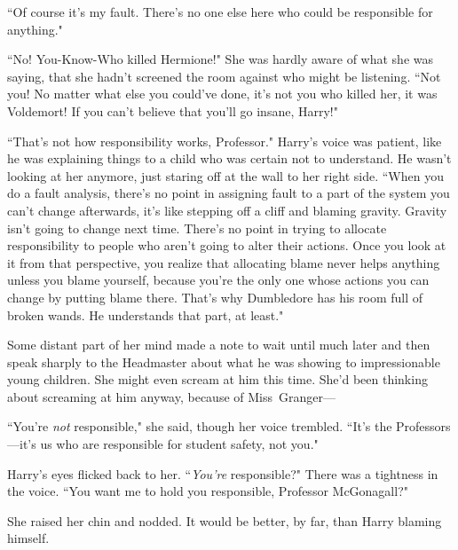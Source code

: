 ``Of course it's my fault. There's no one else here who could be responsible for anything."

``No! You-Know-Who killed Hermione!" She was hardly aware of what she was saying, that she hadn't screened the room against who might be listening. ``Not you! No matter what else you could've done, it's not you who killed her, it was Voldemort! If you can't believe that you'll go insane, Harry!"

``That's not how responsibility works, Professor." Harry's voice was patient, like he was explaining things to a child who was certain not to understand. He wasn't looking at her anymore, just staring off at the wall to her right side. ``When you do a fault analysis, there's no point in assigning fault to a part of the system you can't change afterwards, it's like stepping off a cliff and blaming gravity. Gravity isn't going to change next time. There's no point in trying to allocate responsibility to people who aren't going to alter their actions. Once you look at it from that perspective, you realize that allocating blame never helps anything unless you blame yourself, because you're the only one whose actions you can change by putting blame there. That's why Dumbledore has his room full of broken wands. He understands that part, at least."

Some distant part of her mind made a note to wait until much later and then speak sharply to the Headmaster about what he was showing to impressionable young children. She might even scream at him this time. She'd been thinking about screaming at him anyway, because of Miss~Granger---

``You're \emph{not} responsible," she said, though her voice trembled. ``It's the Professors---it's us who are responsible for student safety, not you."

Harry's eyes flicked back to her. ``\emph{You're} responsible?" There was a tightness in the voice. ``You want me to hold you responsible, Professor McGonagall?"

She raised her chin and nodded. It would be better, by far, than Harry blaming himself.

